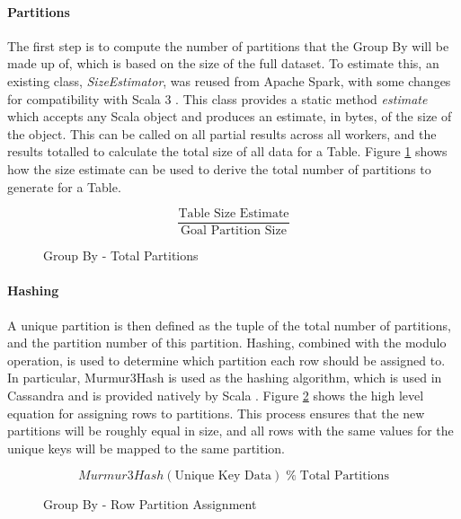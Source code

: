 \paragraph{Partitions}
The first step is to compute the number of partitions that the Group By will be made up of, which is based on the size of the full dataset. To estimate this, an existing class, \textit{SizeEstimator}, was reused from Apache Spark, with some changes for compatibility with Scala 3 \cite{zaharia2016spark}. This class provides a static method \textit{estimate} which accepts any Scala object and produces an estimate, in bytes, of the size of the object. This can be called on all partial results across all workers, and the results totalled to calculate the total size of all data for a Table. Figure \ref{fig:group-by-num-partitions} shows how the size estimate can be used to derive the total number of partitions to generate for a Table.

\begin{figure}[h]
	\centering
	\[ \frac{\text{Table Size Estimate}}{\text{Goal Partition Size}} \]
	\caption{Group By - Total Partitions}
	\label{fig:group-by-num-partitions}
\end{figure}



\paragraph{Hashing} 
A unique partition is then defined as the tuple of the total number of partitions, and the partition number of this partition. Hashing, combined with the modulo operation, is used to determine which partition each row should be assigned to. In particular, Murmur3Hash is used as the hashing algorithm, which is used in Cassandra and is provided natively by Scala \cite{murmur3hash}. Figure \ref{fig:group-by-partition-assign} shows the high level equation for assigning rows to partitions. This process ensures that the new partitions will be roughly equal in size, and all rows with the same values for the unique keys will be mapped to the same partition.

\begin{figure}[h]
	\centering
	\[ Murmur3Hash(\text{Unique Key Data}) \; \%  \; \text{Total Partitions} \]
	\caption{Group By - Row Partition Assignment}
	\label{fig:group-by-partition-assign}
\end{figure} 

